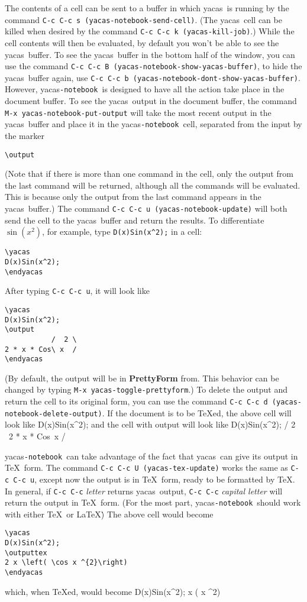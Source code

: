 \documentclass[12pt]{article}
\def\ys{\textsf{yacas}}
\def\yn{\textsf{yacas}\texttt{-notebook}}
\begin{document}
The contents of a cell can be sent to a buffer in which \ys\ is
running by the command \texttt{C-c C-c s (yacas-notebook-send-cell)}.  (The
\ys\ cell can be killed when desired by the command 
\texttt{C-c C-c k (yacas-kill-job)}.)  While the cell contents will
then be evaluated, by default you won't be able to see the \ys\
buffer.  To see the \ys\ buffer in the bottom half of the window,
you can use the command \texttt{C-c C-c B (yacas-notebook-show-yacas-buffer)},
to hide the \ys\ buffer again, use \texttt{C-c C-c b
(yacas-notebook-dont-show-yacas-buffer)}.  However, \yn\ is designed to
have all the action take place in the document buffer.  To see the
\ys\ output in the document buffer, the command \texttt{M-x
  yacas-notebook-put-output} will take the most recent output in the \ys\
buffer and place it in the \yn\ cell, separated from the input by
the marker
\begin{verbatim}
\output
\end{verbatim}
(Note that if there is more than one command in the cell, only the
output from the last command will be returned, although all the
commands will be evaluated.  This is because only the output from the
last command appears in the \ys\ buffer.)
The command \texttt{C-c C-c u (yacas-notebook-update)} will both send the cell
to the \ys\ buffer and return the results.  To differentiate
$\sin(x^2)$, for example, type \texttt{D(x)Sin(x\^{}2);} in a cell:
\begin{verbatim}
\yacas
D(x)Sin(x^2);
\endyacas
\end{verbatim}
After typing \texttt{C-c C-c u}, it will look like
\begin{verbatim}
\yacas
D(x)Sin(x^2);
\output
           /  2 \
2 * x * Cos\ x  /
\endyacas
\end{verbatim}
(By default, the output will be in \textbf{PrettyForm} from.  This
behavior can be changed by typing \texttt{M-x yacas-toggle-prettyform}.)
To delete the output and return the cell to its original form, you can
use the command \texttt{C-c C-c d (yacas-notebook-delete-output)}.  If the
document is to be \TeX{}ed, the above cell will look like
\yacas
D(x)Sin(x^2);
\endyacas
and the cell with output will look like
\yacas
D(x)Sin(x^2);
\output
           /  2 \
2 * x * Cos\ x  /
\endyacas

\yn\ can take advantage of the fact that \ys\ can give its output
in \TeX\ form.  The command \texttt{C-c C-c U (yacas-tex-update)}
works the same as \texttt{C-c C-c u}, except now the output is in
\TeX\ form, ready to be formatted by \TeX.  In general, if
\texttt{C-c C-c} \textsl{letter} returns \ys\ output, 
\texttt{C-c C-c} \textsl{capital letter} will return the output in
\TeX\ form.  (For the most part, \yn\ should work with either
\TeX\ or \LaTeX\.)  The above cell would become
\begin{verbatim}
\yacas
D(x)Sin(x^2);
\outputtex
2 x \left( \cos x ^{2}\right) 
\endyacas
\end{verbatim}
which, when \TeX{}ed, would become
\newpage
\yacas
D(x)Sin(x^2);
 x \left( \cos x ^{2}\right) 
\endyacas
\end{document}

